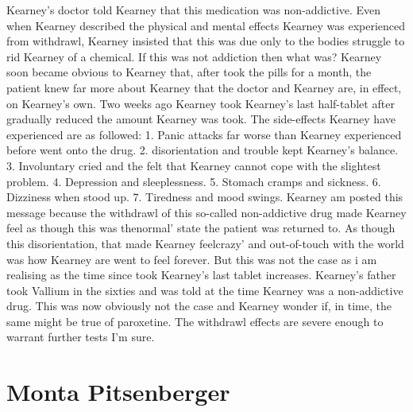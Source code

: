 \documentclass[12pt]{book}
\begin{document}
Kearney's doctor told Kearney that this medication was non-addictive. Even when Kearney described the physical and mental effects Kearney was experienced from withdrawl, Kearney insisted that this was due only to the bodies struggle to rid Kearney of a chemical. If this was not addiction then what was? Kearney soon became obvious to Kearney that, after took the pills for a month, the patient knew far more about Kearney that the doctor and Kearney are, in effect, on Kearney's own. Two weeks ago Kearney took Kearney's last half-tablet after gradually reduced the amount Kearney was took. The side-effects Kearney have experienced are as followed: 1. Panic attacks far worse than Kearney experienced before went onto the drug. 2. disorientation and trouble kept Kearney's balance. 3. Involuntary cried and the felt that Kearney cannot cope with the slightest problem. 4. Depression and sleeplessness. 5. Stomach cramps and sickness. 6. Dizziness when stood up. 7. Tiredness and mood swings. Kearney am posted this message because the withdrawl of this so-called non-addictive drug made Kearney feel as though this was thenormal' state the patient was returned to. As though this disorientation, that made Kearney feelcrazy' and out-of-touch with the world was how Kearney are went to feel forever. But this was not the case as i am realising as the time since took Kearney's last tablet increases. Kearney's father took Vallium in the sixties and was told at the time Kearney was a non-addictive drug. This was now obviously not the case and Kearney wonder if, in time, the same might be true of paroxetine. The withdrawl effects are severe enough to warrant further tests I'm sure.



\chapter{Monta Pitsenberger}
\end{document}
